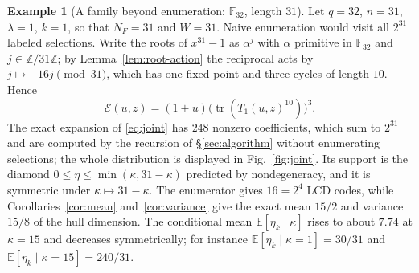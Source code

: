 \documentclass[10pt,a4paper]{article}
\newcommand{\F}{\mathbb F}
\newcommand{\Epoly}{\mathscr E}
\numberwithin{equation}{section}
\theoremstyle{plain}
\theoremstyle{definition}
\newtheorem{example}[theorem]{Example}
\theoremstyle{remark}
\begin{document}
\begin{example}[A family beyond enumeration: \texorpdfstring{$\F_{32}$}{F32}, length \texorpdfstring{$31$}{31}]\label{ex:F32}
Let $q=32$, $n=31$, $\lambda=1$, $k=1$, so that $N_F=31$ and $W=31$. Naive
enumeration would visit all $2^{31}$ labeled selections. Write the roots of
$x^{31}-1$ as $\alpha^j$ with $\alpha$ primitive in $\F_{32}$ and
$j\in\mathbb Z/31\mathbb Z$; by Lemma~\ref{lem:root-action} the reciprocal acts
by $j\mapsto-16j\pmod{31}$, which has one fixed point and three cycles of length
$10$. Hence
\[
\Epoly(u,z)=(1+u)\bigl(\operatorname{tr}(T_1(u,z)^{10})\bigr)^3 .
\]
The exact expansion of \eqref{eq:joint} has $248$ nonzero coefficients, which sum
to $2^{31}$ and are computed by the recursion of \S\ref{sec:algorithm} without
enumerating selections; the whole distribution is displayed in
Fig.~\ref{fig:joint}. Its support is the diamond
$0\le\eta\le\min(\kappa,31-\kappa)$ predicted by nondegeneracy, and it is
symmetric under $\kappa\mapsto31-\kappa$. The enumerator gives $16=2^4$ LCD codes,
while Corollaries~\ref{cor:mean} and~\ref{cor:variance} give the exact mean
$15/2$ and variance $15/8$ of the hull dimension. The conditional mean
$\mathbb E[\eta_k\mid\kappa]$ rises to about $7.74$ at $\kappa=15$ and decreases
symmetrically; for instance $\mathbb E[\eta_k\mid\kappa=1]=30/31$ and
$\mathbb E[\eta_k\mid\kappa=15]=240/31$.
\end{example}
\end{document}
